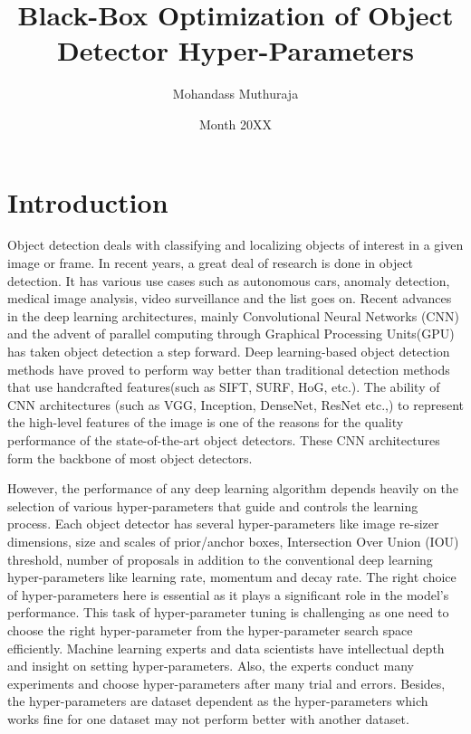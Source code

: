 \documentclass[thesis]{mas_proposal}
\title{Black-Box Optimization of Object Detector Hyper-Parameters}
\author{Mohandass Muthuraja}
\date{Month 20XX}
\begin{document}
\maketitle

\pagestyle{plain}

\section{Introduction}
Object detection deals with classifying and localizing objects of interest in a given image or frame. In recent years, a great deal of research is done in object detection. It has various use cases such as autonomous cars, anomaly detection, medical image analysis, video surveillance and the list goes on. Recent advances in the deep learning architectures, mainly Convolutional Neural Networks (CNN) and the advent of parallel computing through Graphical Processing Units(GPU) has taken object detection a step forward. Deep learning-based object detection methods have proved to perform way better than traditional detection methods that use handcrafted features(such as SIFT, SURF, HoG, etc.)\cite{zou2019object}. The ability of CNN architectures (such as VGG\cite{simonyan2014very}, Inception\cite{szegedy2015going}, DenseNet\cite{huang2017densely}, ResNet\cite{he2016deep} etc.,) to represent the high-level features of the image is one of the reasons for the quality performance of the state-of-the-art object detectors. These CNN architectures form the backbone of most object detectors.

However, the performance of any deep learning algorithm depends heavily on the selection of various hyper-parameters that guide and controls the learning process. Each object detector has several hyper-parameters like image re-sizer dimensions, size and scales of prior/anchor boxes, Intersection Over Union (IOU) threshold, number of proposals in addition to the conventional deep learning hyper-parameters like learning rate, momentum and decay rate. The right choice of hyper-parameters here is essential as it plays a significant role in the model's performance. This task of hyper-parameter tuning is challenging as one need to choose the right hyper-parameter from the hyper-parameter search space efficiently. Machine learning experts and data scientists have intellectual depth and insight on setting hyper-parameters. Also, the experts conduct many experiments and choose hyper-parameters after many trial and errors. Besides, the hyper-parameters are dataset dependent as the hyper-parameters which works fine for one dataset may not perform better with another dataset\cite{automl_book}.
\end{document}
